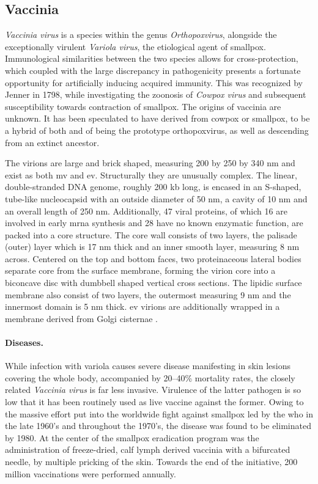 \subsection{Vaccinia}
\textit{Vaccinia virus} is a species within the genus \textit{Orthopoxvirus}, alongside the exceptionally virulent \textit{Variola virus}, the etiological agent of smallpox. Immunological similarities between the two species allows for cross-protection, which coupled with the large discrepancy in pathogenicity presents a fortunate opportunity for artificially inducing acquired immunity. This was recognized by Jenner in 1798, while investigating the zoonosis of \textit{Cowpox virus} and subsequent susceptibility towards contraction of smallpox. The origins of vaccinia are unknown. It has been speculated to have derived from cowpox or smallpox, to be a hybrid of both and of being the prototype orthopoxvirus, as well as descending from an extinct ancestor.

The virions are large and brick shaped, measuring 200 by 250 by 340 nm and exist as both \gls{mv} and \gls{ev}. Structurally they are unusually complex. The linear, double-stranded DNA genome, roughly 200 kb long, is encased in an S-shaped, tube-like nucleocapsid with an outside diameter of 50 nm, a cavity of 10 nm and an overall length of 250 nm. Additionally, 47 viral proteins, of which 16 are involved in early \gls{mrna} synthesis and 28 have no known enzymatic function, are packed into a core structure. The core wall consists of two layers, the palisade (outer) layer which is 17 nm thick and an inner smooth layer, measuring 8 nm across. Centered on the top and bottom faces, two proteinaceous lateral bodies separate core from the surface membrane, forming the virion core into a biconcave disc with dumbbell shaped vertical cross sections. The lipidic surface membrane also consist of two layers, the outermost measuring 9 nm and the innermost domain is 5 nm thick. \Gls{ev} virions are additionally wrapped in a membrane derived from Golgi cisternae \citep{Marennikova2005,Condit2006}.

\paragraph{Diseases.}
While infection with variola causes severe disease manifesting in skin lesions covering the whole body, accompanied by 20--40\% mortality rates, the closely related \textit{Vaccinia virus} is far less invasive. Virulence of the latter pathogen is so low that it has been routinely used as live vaccine against the former. Owing to the massive effort put into the worldwide fight against smallpox led by the \gls{who} in the late 1960's and throughout the 1970's, the disease was found to be eliminated by 1980. At the center of the smallpox eradication program was the administration of freeze-dried, calf lymph derived vaccinia with a bifurcated needle, by multiple pricking of the skin. Towards the end of the initiative, 200 million vaccinations were performed annually.

